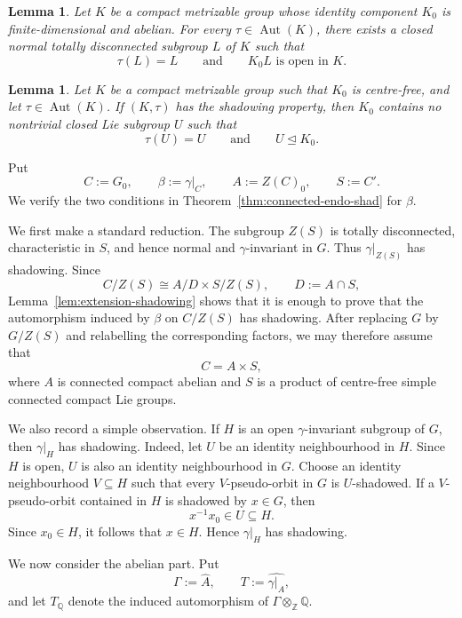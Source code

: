 \documentclass[12pt]{amsart}
\newtheorem{lemma}[theorem]{Lemma}
\theoremstyle{definition}
\numberwithin{equation}{section}
\theoremstyle{remark}
\def\Aut{\operatorname{Aut}}
\begin{document}
\begin{lemma}\label{lem:abelian-comp}
	\cite[Lemma~23]{AD}
	Let $K$ be a compact metrizable group whose identity component $K_0$
	is finite-dimensional and abelian. For every $\tau\in\Aut(K)$, there
	exists a closed normal totally disconnected subgroup $L$ of $K$ such
	that
	\[
	\tau(L)=L
	\qquad\text{and}\qquad
	K_0L\text{ is open in }K.
	\]
\end{lemma}

\begin{lemma}\label{lem:AD-semisimple}
	\cite[Lemma~29]{AD}
	Let $K$ be a compact metrizable group such that $K_0$ is centre-free,
	and let $\tau\in\Aut(K)$. If $(K,\tau)$ has the shadowing property, then
	$K_0$ contains no nontrivial closed Lie subgroup $U$ such that
	\[
	\tau(U)=U
	\qquad\text{and}\qquad
	U\trianglelefteq K_0.
	\]
\end{lemma}


Put
\[
C:=G_0,
\qquad
\beta:=\gamma|_C,
\qquad
A:=Z(C)_0,
\qquad
S:=C'.
\]
We verify the two conditions in
Theorem~\ref{thm:connected-endo-shad} for $\beta$.

We first make a standard reduction. The subgroup $Z(S)$ is totally
disconnected, characteristic in $S$, and hence normal and
$\gamma$-invariant in $G$. Thus $\gamma|_{Z(S)}$ has shadowing. Since
\[
C/Z(S)\cong A/D\times S/Z(S),
\qquad D:=A\cap S,
\]
Lemma~\ref{lem:extension-shadowing} shows that it is enough to prove
that the automorphism induced by $\beta$ on $C/Z(S)$ has shadowing.
After replacing $G$ by $G/Z(S)$ and relabelling the corresponding
factors, we may therefore assume that
\[
C=A\times S,
\]
where $A$ is connected compact abelian and $S$ is a product of
centre-free simple connected compact Lie groups.

We also record a simple observation. If $H$ is an open
$\gamma$-invariant subgroup of $G$, then $\gamma|_H$ has shadowing.
Indeed, let $U$ be an identity neighbourhood in $H$. Since $H$ is
open, $U$ is also an identity neighbourhood in $G$. Choose an identity
neighbourhood $V\subseteq H$ such that every $V$-pseudo-orbit in $G$
is $U$-shadowed. If a $V$-pseudo-orbit contained in $H$ is shadowed by
$x\in G$, then
\[
x^{-1}x_0\in U\subseteq H.
\]
Since $x_0\in H$, it follows that $x\in H$. Hence
$\gamma|_H$ has shadowing.

We now consider the abelian part. Put
\[
\Gamma:=\widehat A,
\qquad
T:=\widehat{\gamma|_A},
\]
and let $T_{\mathbb Q}$ denote the induced automorphism of
$\Gamma\otimes_{\mathbb Z}\mathbb Q$.
\end{document}
